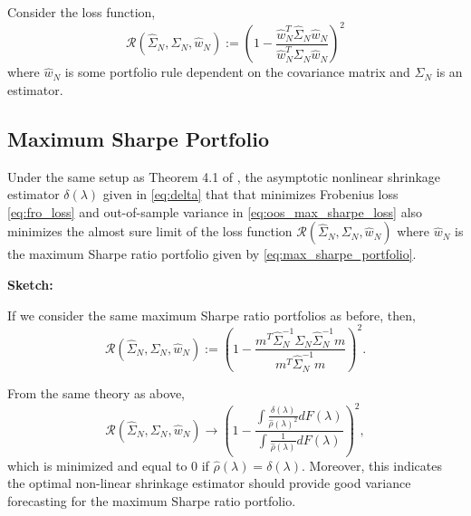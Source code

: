 \documentclass{article}
\begin{document}
Consider the loss function,
$$
	\mathcal{R}(\hat{\Sigma}_N, \Sigma_N, \hat{w}_N)
		:= \left(
			1 - \frac{\hat{w}_N^T \hat{\Sigma}_N \hat{w}_N} {\hat{w}_N^T \Sigma_N \hat{w}_N}
			\right)^2
$$
where $\hat{w}_N$ is some portfolio rule dependent on the covariance matrix
and $\hat{\Sigma}_N$ is an estimator.

\subsection{Maximum Sharpe Portfolio}

\begin{thm} Under the same setup as Theorem 4.1 of \cite{Ledoit2017Nonlinear},
	the asymptotic nonlinear shrinkage estimator $\delta(\lambda)$ given in
	\eqref{eq:delta} that that minimizes Frobenius loss \eqref{eq:fro_loss} and
	out-of-sample variance in \eqref{eq:oos_max_sharpe_loss} also minimizes the
	almost sure limit of the loss function $\mathcal{R}(\hat{\Sigma}_N, \Sigma_N,
	\hat{w}_N)$ where $\hat{w}_N$ is the maximum Sharpe ratio portfolio given by
	\eqref{eq:max_sharpe_portfolio}.
\end{thm}

{\bf Sketch:}

If we consider the same maximum Sharpe ratio portfolios as before, then,
$$
	\mathcal{R}(\hat{\Sigma}_N, \Sigma_N, \hat{w}_N)
		:= \left(
				1 - \frac{m^T \hat{\Sigma}_N^{-1} \Sigma_N \hat{\Sigma}_N^{-1} m} 
								 {m^T \hat{\Sigma}_N^{-1} m}
			\right)^2.
$$


From the same theory as above,
$$
	\mathcal{R}(\hat{\Sigma}_N, \Sigma_N, \hat{w}_N)
	 	\rightarrow 
		 	\left(
				1 - \frac{\int \frac{\delta(\lambda)}{\hat{\rho}(\lambda)^2}dF(\lambda)}
				 				 {\int \frac{1}{\hat{\rho}(\lambda)}dF(\lambda)}
			\right)^2,
$$
which is minimized and equal to 0 if $\hat{\rho}(\lambda) = \delta(\lambda).$
Moreover, this indicates the optimal non-linear shrinkage estimator should
provide good variance forecasting for the maximum Sharpe ratio portfolio.
\end{document}
